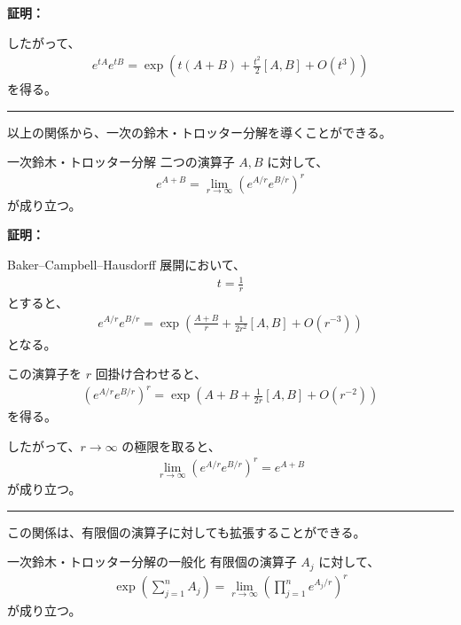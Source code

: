 \documentclass[a4paper,10.5pt]{article}
\numberwithin{equation}{section}
\newenvironment{proofbox}
{\begin{prooflabel}\textbf{証明：}\end{prooflabel}\vspace{0.8em}}
{\par\vspace{1em}\hrule\vspace{1em}}
\begin{document}
\begin{proofbox}
したがって、
\begin{align}
    e^{tA}e^{tB}
    =
    \exp\left(
        t(A+B)
        +
        \frac{t^2}{2}[A,B]
        +
        O(t^3)
    \right)
\end{align}
を得る。
\end{proofbox}

以上の関係から、一次の鈴木・トロッター分解を導くことができる。

\begin{theorembox}{一次鈴木・トロッター分解}
二つの演算子 $A,B$ に対して、
\begin{align}
    e^{A+B}
    =
    \lim_{r\to\infty}
    \left(
        e^{A/r}e^{B/r}
    \right)^r
\end{align}
が成り立つ。
\end{theorembox}

\begin{proofbox}
Baker--Campbell--Hausdorff 展開において、
\begin{align}
    t=\frac{1}{r}
\end{align}
とすると、
\begin{align}
    e^{A/r}e^{B/r}
    =
    \exp\left(
        \frac{A+B}{r}
        +
        \frac{1}{2r^2}[A,B]
        +
        O(r^{-3})
    \right)
\end{align}
となる。

この演算子を $r$ 回掛け合わせると、
\begin{align}
    \left(
        e^{A/r}e^{B/r}
    \right)^r
    =
    \exp\left(
        A+B
        +
        \frac{1}{2r}[A,B]
        +
        O(r^{-2})
    \right)
\end{align}
を得る。

したがって、$r\to\infty$ の極限を取ると、
\begin{align}
    \lim_{r\to\infty}
    \left(
        e^{A/r}e^{B/r}
    \right)^r
    =
    e^{A+B}
\end{align}
が成り立つ。
\end{proofbox}

この関係は、有限個の演算子に対しても拡張することができる。

\begin{theorembox}{一次鈴木・トロッター分解の一般化}
有限個の演算子 $A_j$ に対して、
\begin{align}
    \exp\left(
        \sum_{j=1}^{n}A_j
    \right)
    =
    \lim_{r\to\infty}
    \left(
        \prod_{j=1}^{n}
        e^{A_j/r}
    \right)^r
\end{align}
が成り立つ。
\end{theorembox}
\end{document}
